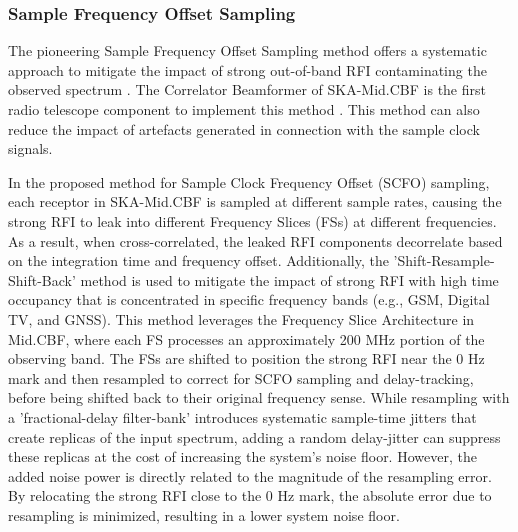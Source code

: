 \subsubsection{Sample Frequency Offset Sampling}

The pioneering Sample Frequency Offset Sampling method offers a systematic approach to mitigate the impact of strong out-of-band RFI contaminating the observed spectrum \citep{carlson_scfo_2017}. The Correlator Beamformer of SKA-Mid.CBF is the first radio telescope component to implement this method \citep{ska_mid_cbf_rfi_2019}. This method can also reduce the impact of artefacts generated in connection with the sample clock signals. 

In the proposed method for Sample Clock Frequency Offset (SCFO) sampling, each receptor in SKA-Mid.CBF is sampled at different sample rates, causing the strong RFI to leak into different Frequency Slices (FSs) at different frequencies. As a result, when cross-correlated, the leaked RFI components decorrelate based on the integration time and frequency offset. Additionally, the 'Shift-Resample-Shift-Back' method is used to mitigate the impact of strong RFI with high time occupancy that is concentrated in specific frequency bands (e.g., GSM, Digital TV, and GNSS). This method leverages the Frequency Slice Architecture in Mid.CBF, where each FS processes an approximately 200 MHz portion of the observing band. The FSs are shifted to position the strong RFI near the 0 Hz mark and then resampled to correct for SCFO sampling and delay-tracking, before being shifted back to their original frequency sense. While resampling with a 'fractional-delay filter-bank' introduces systematic sample-time jitters that create replicas of the input spectrum, adding a random delay-jitter can suppress these replicas at the cost of increasing the system's noise floor. However, the added noise power is directly related to the magnitude of the resampling error. By relocating the strong RFI close to the 0 Hz mark, the absolute error due to resampling is minimized, resulting in a lower system noise floor.